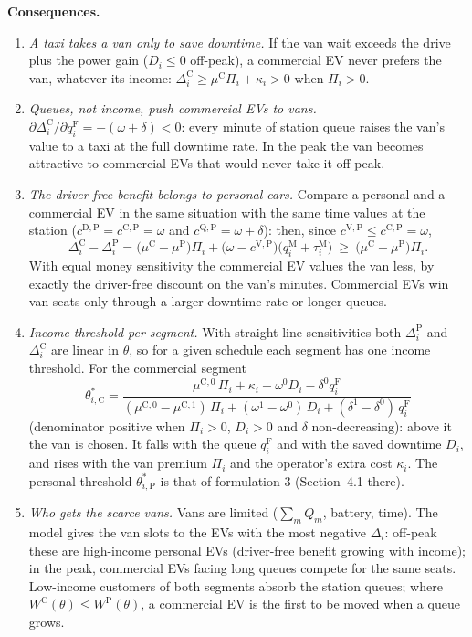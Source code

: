 \documentclass[12pt,a4paper]{article}
\begin{document}
\textbf{Consequences.}
\begin{enumerate}[itemsep=2pt]
  \item \emph{A taxi takes a van only to save downtime.} If the van wait exceeds the drive plus the power gain ($D_i\le0$ off-peak), a commercial EV never prefers the van, whatever its income: $\Delta^{\mathrm C}_i\ge\mu^{\mathrm C}\Pi_i+\kappa_i>0$ when $\Pi_i>0$.
  \item \emph{Queues, not income, push commercial EVs to vans.} $\partial\Delta^{\mathrm C}_i/\partial q^{\mathrm F}_i=-(\omega+\delta)<0$: every minute of station queue raises the van's value to a taxi at the full downtime rate. In the peak the van becomes attractive to commercial EVs that would never take it off-peak.
  \item \emph{The driver-free benefit belongs to personal cars.} Compare a personal and a commercial EV in the same situation with the same time values at the station ($c^{\mathrm D,\mathrm P}=c^{\mathrm C,\mathrm P}=\omega$ and $c^{\mathrm Q,\mathrm P}=\omega+\delta$): then, since $c^{\mathrm V,\mathrm P}\le c^{\mathrm C,\mathrm P}=\omega$,
  \[
  \Delta^{\mathrm C}_i-\Delta^{\mathrm P}_i=\big(\mu^{\mathrm C}-\mu^{\mathrm P}\big)\Pi_i+\big(\omega-c^{\mathrm V,\mathrm P}\big)\big(q^{\mathrm M}_i+\tau^{\mathrm M}_i\big)\ \ge\ \big(\mu^{\mathrm C}-\mu^{\mathrm P}\big)\Pi_i .
  \]
  With equal money sensitivity the commercial EV values the van less, by exactly the driver-free discount on the van's minutes. Commercial EVs win van seats only through a larger downtime rate or longer queues.
  \item \emph{Income threshold per segment.} With straight-line sensitivities both $\Delta^{\mathrm P}_i$ and $\Delta^{\mathrm C}_i$ are linear in $\theta$, so for a given schedule each segment has one income threshold. For the commercial segment
  \[
  \theta^{*}_{i,\mathrm C}=\frac{\mu^{\mathrm C,0}\,\Pi_i+\kappa_i-\omega^{0}D_i-\delta^{0}q^{\mathrm F}_i}{(\mu^{\mathrm C,0}-\mu^{\mathrm C,1})\,\Pi_i+(\omega^{1}-\omega^{0})\,D_i+(\delta^{1}-\delta^{0})\,q^{\mathrm F}_i}
  \]
  (denominator positive when $\Pi_i>0$, $D_i>0$ and $\delta$ non-decreasing): above it the van is chosen. It falls with the queue $q^{\mathrm F}_i$ and with the saved downtime $D_i$, and rises with the van premium $\Pi_i$ and the operator's extra cost $\kappa_i$. The personal threshold $\theta^{*}_{i,\mathrm P}$ is that of formulation 3 (Section~4.1 there).
  \item \emph{Who gets the scarce vans.} Vans are limited ($\sum_mQ_m$, battery, time). The model gives the van slots to the EVs with the most negative $\Delta_i$: off-peak these are high-income personal EVs (driver-free benefit growing with income); in the peak, commercial EVs facing long queues compete for the same seats. Low-income customers of both segments absorb the station queues; where $W^{\mathrm C}(\theta)\le W^{\mathrm P}(\theta)$, a commercial EV is the first to be moved when a queue grows.

\end{enumerate}
\end{document}
